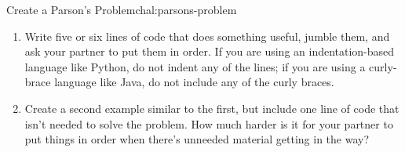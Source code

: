 \begin{challenge}{Create a Parson's Problem}{chal:parsons-problem}

\begin{enumerate}

\item
  Write five or six lines of code that does something useful, jumble
  them, and ask your partner to put them in order.  If you are using
  an indentation-based language like Python, do not indent any of the
  lines; if you are using a curly-brace language like Java, do not
  include any of the curly braces.

\item
  Create a second example similar to the first, but include one line
  of code that isn't needed to solve the problem.  How much harder is
  it for your partner to put things in order when there's unneeded
  material getting in the way?

\end{enumerate}

\end{challenge}
